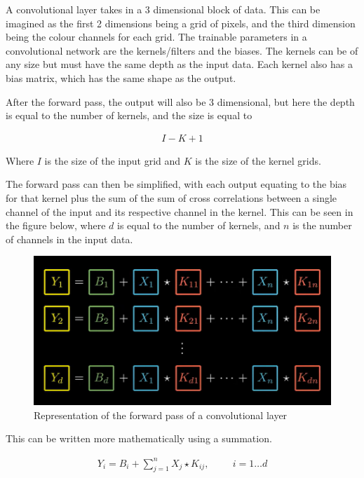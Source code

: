 \documentclass{article}
\begin{document}
    A convolutional layer takes in a 3 dimensional block of data. This can be imagined as the first 2 dimensions being a grid of pixels, and the third dimension
    being the colour channels for each grid. The trainable parameters in a convolutional network are the kernels/filters and the biases. The kernels can be of any size
    but must have the same depth as the input data. Each kernel also has a bias matrix, which has the same shape as the output.

    After the forward pass, the output will also be 3 dimensional, but here the depth is equal to the number of kernels, and the size is equal to

    \begin{align}
        I - K + 1
    \end{align}

    Where $I$ is the size of the input grid and $K$ is the size of the kernel grids.

    The forward pass can then be simplified, with each output equating to the bias for that kernel plus the sum of the sum of cross correlations between a single channel
    of the input and its respective channel in the kernel. This can be seen in the figure below, where $d$ is equal to the number of kernels, and $n$ is the number of channels in the input data.


    \pagebreak
    \begin{figure}
        \centering
        \includegraphics[scale=0.3]{ConvForwardPropIndependentCode.png}
        \caption{Representation of the forward pass of a convolutional layer}
    \end{figure}

    This can be written more mathematically using a summation.

    \begin{align}
        Y_i = B_i + \sum_{j=1}^{n}X_j \star K_{ij}, \hspace{1cm} i = 1 \dots d
    \end{align}
\end{document}
